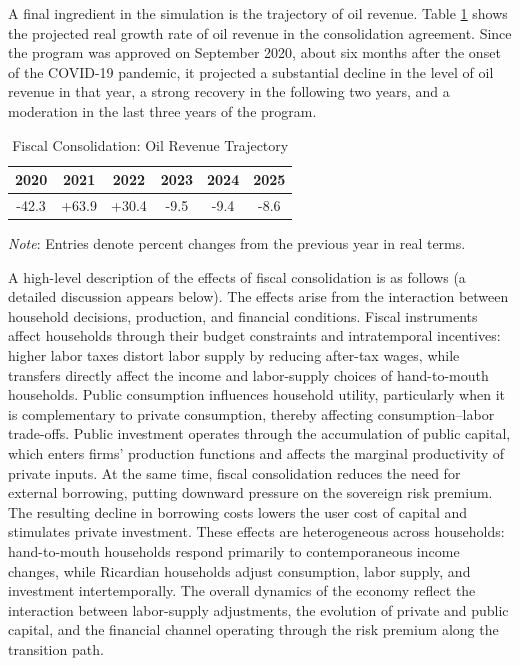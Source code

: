 \documentclass[12pt]{article}
\begin{document}
A final ingredient in the simulation is the trajectory of oil revenue. Table \ref{tab:tIMF_oilrevenue} shows the projected real growth rate of oil revenue in the consolidation agreement. Since the program was approved on September 2020, about six months after the onset of the COVID-19 pandemic, it projected a substantial decline in the level of oil revenue in that year, a strong recovery in the following two years, and a moderation in the last three years of the program.

\begin{table}[ht] 
      \centering 
     \caption{Fiscal Consolidation: Oil Revenue Trajectory}  \label{tab:tIMF_oilrevenue}
     \begin{threeparttable}
     \begin{tabular}{c c c c c c }
  \hline \hline
2020& 2021& 2022& 2023& 2024& 2025 \\
\hline \hline
-42.3 & +63.9 & +30.4 & -9.5 & -9.4 & -8.6 \\
\hline
 \end{tabular}
 \begin{tablenotes}
\small
\item  \footnotesize \emph{Note}: Entries denote percent changes from the previous year in real terms.
\end{tablenotes}
     \end{threeparttable}
\end{table}

A high-level description of the effects of fiscal consolidation is as follows (a detailed discussion appears below). The effects arise from the interaction between household decisions, production, and financial conditions. Fiscal instruments affect households through their budget constraints and intratemporal incentives: higher labor taxes distort labor supply by reducing after-tax wages, while transfers directly affect the income and labor-supply choices of hand-to-mouth households. Public consumption influences household utility, particularly when it is complementary to private consumption, thereby affecting consumption–labor trade-offs. Public investment operates through the accumulation of public capital, which enters firms’ production functions and affects the marginal productivity of private inputs. At the same time, fiscal consolidation reduces the need for external borrowing, putting downward pressure on the sovereign risk premium. The resulting decline in borrowing costs lowers the user cost of capital and stimulates private investment. These effects are heterogeneous across households: hand-to-mouth households respond primarily to contemporaneous income changes, while Ricardian households adjust consumption, labor supply, and investment intertemporally. The overall dynamics of the economy reflect the interaction between labor-supply adjustments, the evolution of private and public capital, and the financial channel operating through the risk premium along the transition path.
\end{document}
